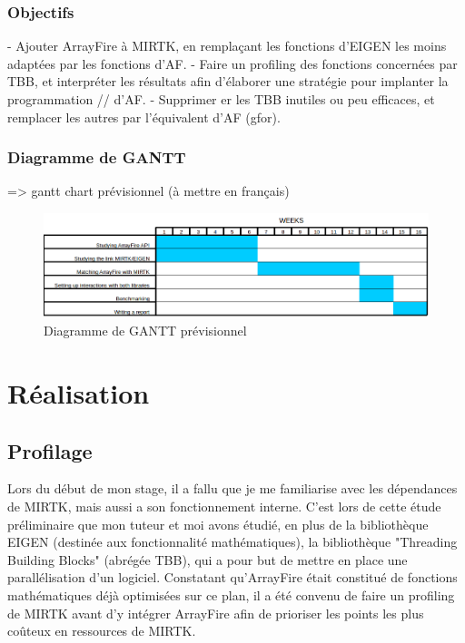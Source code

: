 \documentclass[10pt]{report}
\begin{document}
	\subsection{Objectifs} 
	- Ajouter ArrayFire à MIRTK, en remplaçant les fonctions d'EIGEN les moins adaptées par les fonctions d'AF. \newline
	- Faire un profiling des fonctions concernées par TBB, et interpréter les résultats afin d'élaborer une stratégie pour implanter la programmation // d'AF.\newline
	- Supprimer er les TBB inutiles ou peu efficaces, et remplacer les autres par l'équivalent d'AF (gfor).\newline
	
	
	\subsection{Diagramme de GANTT}
	 => gantt chart prévisionnel (à mettre en français)
	\begin{figure}[h!]
		\begin{center}
			\includegraphics[width=18cm]{Reports/figures/estimated_gantt.png}
		\end{center}	
		\caption{Diagramme de GANTT prévisionnel}
		\label{Diagramme de GANTT prévisionnel}
	\end{figure}
\chapter{Réalisation}
	\section{Profilage}
	Lors du début de mon stage, il a fallu que je me familiarise avec les dépendances de MIRTK, mais aussi a son fonctionnement interne. C'est lors de cette étude préliminaire que mon tuteur et moi avons étudié, en plus de la bibliothèque EIGEN (destinée aux fonctionnalité mathématiques), la bibliothèque "Threading Building Blocks" (abrégée TBB), qui a pour but de mettre en place une parallélisation d'un logiciel. Constatant qu'ArrayFire était constitué de fonctions mathématiques déjà optimisées sur ce plan, il a été convenu de faire un profiling de MIRTK avant d'y intégrer ArrayFire afin de prioriser les points les plus coûteux en ressources de MIRTK. 
	
\end{document}
